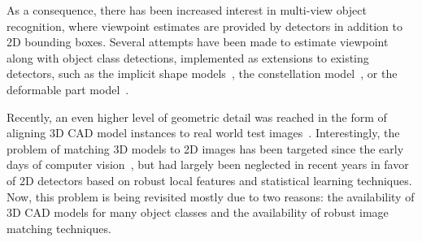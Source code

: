 As a consequence, there has been increased interest in multi-view object
recognition, where viewpoint estimates are provided by
detectors in addition to 2D bounding boxes. Several attempts have been
made to estimate viewpoint along with object class detections,
implemented as extensions to existing detectors, such as the implicit
shape models~\cite{}, the constellation model~\cite{}, or the
deformable part model~\cite{Xiang12,Pepik12,Fidler12,Hejrati14}.

Recently, an even higher level of geometric detail was reached in the
form of aligning
3D CAD model instances to real world test images~\cite{Aubry14,
  Lim14,Kholgade14, Chen13, Kostas14}. Interestingly, the problem of matching 3D models to 2D
images has been targeted since the early days of computer
vision~\cite{Lowe87}, but had largely been neglected in recent years
in favor of 2D detectors based on robust local features and
statistical learning techniques. Now, this problem is being revisited
mostly due to two reasons: the availability of 3D CAD models for many
object classes and the availability of robust image matching
techniques.
%
%
%
%

